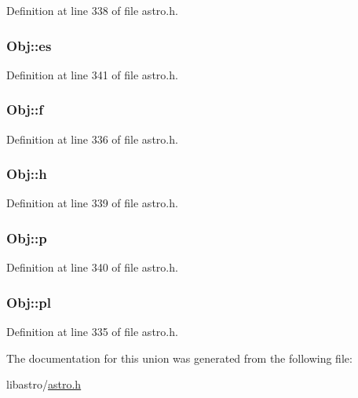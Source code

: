Definition at line 338 of file astro.\-h.

\hypertarget{union_obj_abde2a9cfca01fb66e841ab82e343b710}{
\subsubsection[{es}]{ Obj\-::es}}\label{union_obj_abde2a9cfca01fb66e841ab82e343b710}


Definition at line 341 of file astro.\-h.

\hypertarget{union_obj_a208e4a5dfb78b3b3e667b481694b155c}{
\subsubsection[{f}]{ Obj\-::f}}\label{union_obj_a208e4a5dfb78b3b3e667b481694b155c}


Definition at line 336 of file astro.\-h.

\hypertarget{union_obj_abbef64a85f55d6aaff88d47e2a9dc883}{
\subsubsection[{h}]{ Obj\-::h}}\label{union_obj_abbef64a85f55d6aaff88d47e2a9dc883}


Definition at line 339 of file astro.\-h.

\hypertarget{union_obj_a698977a8ec8db73cf433246f32a1c88c}{
\subsubsection[{p}]{ Obj\-::p}}\label{union_obj_a698977a8ec8db73cf433246f32a1c88c}


Definition at line 340 of file astro.\-h.

\hypertarget{union_obj_a85c3757106e1ff2302aa87006eebc31e}{
\subsubsection[{pl}]{ Obj\-::pl}}\label{union_obj_a85c3757106e1ff2302aa87006eebc31e}


Definition at line 335 of file astro.\-h.



The documentation for this union was generated from the following file\-:\begin{DoxyCompactItemize}
\item 
libastro/\hyperlink{astro_8h}{astro.\-h}\end{DoxyCompactItemize}
